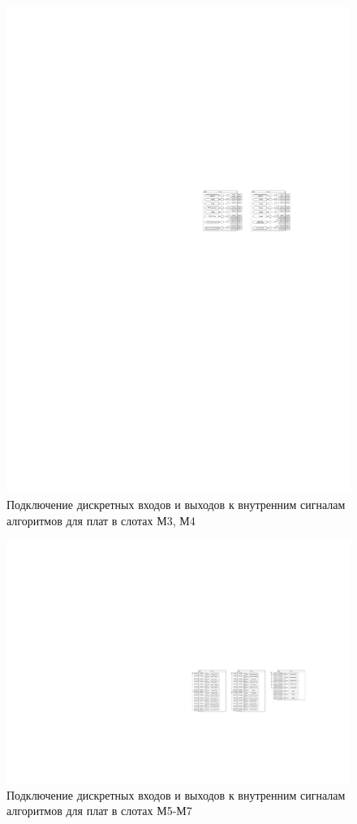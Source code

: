 \documentclass[a4paper, 12pt,table, hidelinks, DIV=calc]{extarticle} %
\begin{document}
\begin{appendices}
\begin{landscape}
\begin{figure}[h!]
  \centering
  \includegraphics[width=1.5\textwidth]{img49.pdf}
  \caption{Подключение дискретных входов и выходов к внутренним сигналам алгоритмов для плат в слотах М3, М4}
  \label{fig:sig22} %
\end{figure}

\begin{figure}[h!]
  \centering
  \includegraphics[width=1.45\textwidth]{img50.pdf}
  \caption{Подключение дискретных входов и выходов к внутренним сигналам алгоритмов для плат в слотах М5-М7}
  \label{fig:sig23} %
\end{figure}


\end{landscape}
\end{appendices}
\end{document}
